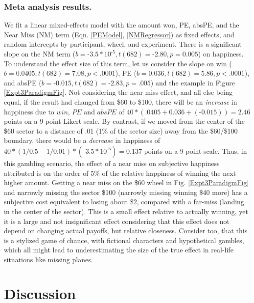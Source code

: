 \documentclass[10pt,letterpaper]{article}
\newcommand{\red}[1]{\textcolor{Red}{#1}}
\begin{document}
\subsubsection{Meta analysis results.}

We fit a linear mixed-effects model with the amount won, PE, absPE, and the Near Miss (NM) term (Eqn. \ref{PEModel}, \ref{NMRegressor}) as fixed effects, and random intercepts by participant, wheel, and experiment. There is a significant slope on the NM term ($b = \text{-}3.5 * 10^{\text{-}5}, t(682)=\text{-}2.80, p=0.005$) on happiness. To understand the effect size of this term, let us consider the slope on win ($b = 0.0405, t(682) = 7.08, p<.0001$), PE ($b=0.036, t(682)=5.86, p<.0001$), and absPE ($b=\text{-}0.015, t(682) = \text{-}2.83, p=.005$) and the example in Figure \ref{Expt3ParadigmFig}. Not considering the near miss effect, and all else being equal, if the result had changed from \$60 to \$100, there will be an \textit{increase} in happiness due to $win$, $PE$ and $absPE$ of $40*(.0405+0.036+(\text{-}0.015)) = 2.46$ points on a 9 point Likert scale. By contrast, if we moved from the center of the \$60 sector to a distance of .01 (1\% of the sector size) away from the \$60/\$100 boundary, there would be a \textit{decrease} in happiness of $40*(1/0.5 - 1/0.01)*(\text{-}3.5 * 10^{\text{-}5}) = 0.137$ points on a 9 point scale. Thus, in this gambling scenario, the effect of a near miss on subjective happiness attributed is on the order of 5\% of the relative happiness of winning the next higher amount. Getting a near miss on the \$60 wheel in Fig. \ref{Expt3ParadigmFig} and narrowly missing the sector \$100 (narrowly missing winning \$40 more) has a subjective cost equivalent to losing about \$2, compared with a far-miss (landing in the center of the sector). This is a small effect relative to actually winning, yet it is a large and not insignificant effect considering that this effect does not depend on changing actual payoffs, but relative closeness. Consider too, that this is a stylized game of chance, with fictional characters and hypothetical gambles, which all might lead to underestimating the size of the true effect in real-life situations like missing planes.


\section{Discussion}
\end{document}
